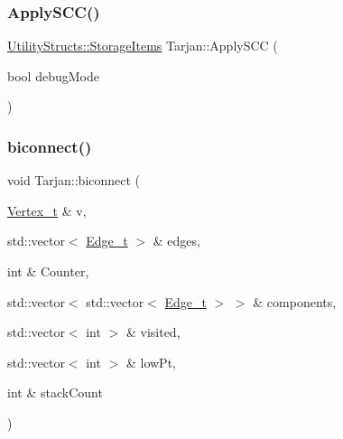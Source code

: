 \mbox{\label{class_tarjan_a58ad9fcfd599a608fa1671e4607db378_a58ad9fcfd599a608fa1671e4607db378}} 
\subsubsection{\texorpdfstring{Apply\+S\+C\+C()}{ApplySCC()}}
{\footnotesize\ttfamily \hyperlink{struct_utility_structs_1_1_storage_items}{Utility\+Structs\+::\+Storage\+Items} Tarjan\+::\+Apply\+S\+CC (\begin{DoxyParamCaption}\item[{bool}]{debug\+Mode }\end{DoxyParamCaption})}

\mbox{\label{class_tarjan_a52573be5a4930ad84f3807bc49f42026_a52573be5a4930ad84f3807bc49f42026}} 
\subsubsection{\texorpdfstring{biconnect()}{biconnect()}}
{\footnotesize\ttfamily void Tarjan\+::biconnect (\begin{DoxyParamCaption}\item[{\hyperlink{class_graph_component_ae67114a6ce5a001dc35e1996e1b45aa0_ae67114a6ce5a001dc35e1996e1b45aa0}{Vertex\+\_\+t} \&}]{v,  }\item[{std\+::vector$<$ \hyperlink{utilities_8h_af4a84c740ebb77e6a13a00aa289b0018_af4a84c740ebb77e6a13a00aa289b0018}{Edge\+\_\+t} $>$ \&}]{edges,  }\item[{int \&}]{Counter,  }\item[{std\+::vector$<$ std\+::vector$<$ \hyperlink{utilities_8h_af4a84c740ebb77e6a13a00aa289b0018_af4a84c740ebb77e6a13a00aa289b0018}{Edge\+\_\+t} $>$ $>$ \&}]{components,  }\item[{std\+::vector$<$ int $>$ \&}]{visited,  }\item[{std\+::vector$<$ int $>$ \&}]{low\+Pt,  }\item[{int \&}]{stack\+Count }\end{DoxyParamCaption})}

\mbox{\label{class_tarjan_a277c58dc6f712a6ae1ef2e59c9ad58e1_a277c58dc6f712a6ae1ef2e59c9ad58e1}} 
